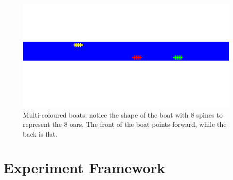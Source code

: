       \begin{figure}[h]
      \begin{center}
      	\includegraphics[scale=0.3]{images/boats.png}
      	\caption{Multi-coloured boats: notice the shape of the boat with 8 spines to represent the 8 oars. The front of the boat points forward, while the back is flat.}
      	\label{techissues:fig:boats}
      \end{center}
      \end{figure}
      
  \section{Experiment Framework}